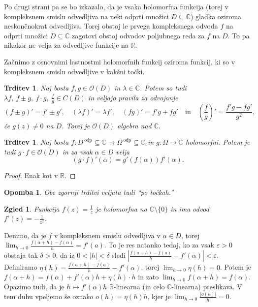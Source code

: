 \documentclass[10pt, a4paper]{article}
\newtheorem{trditev}[izr]{Trditev}
\newtheorem*{opomba}{Opomba}
\newtheorem{zgled}{Zgled}[section]
\newenvironment{noticeC}{%
  \tcolorbox[%
  notitle,
  empty,
  enhanced,  %
  breakable,
  coltext=black, 
  fontupper=\rmfamily,
  parbox=false,
  noparskip,
  sharp corners,
  boxrule=-1pt,  %
  frame hidden,
  left=7pt,  %
  right=7pt,
  top=5pt,
  bottom=5pt,
  before skip=2.5ex plus 2pt,
  after skip=2.5ex plus 2pt,
  overlay unbroken and last={%
  },
  ]}
{\endtcolorbox}
\newenvironment{dokaz}%
  {\begin{noticeC}\begin{proof}}%
  {\end{proof}\end{noticeC}}
\newcommand{\R}{\mathbb {R}}
\newcommand{\C}{\mathbb {C}}
\begin{document}
Po drugi strani pa se bo izkazalo, da je vsaka holomorfna funkcija 
(torej v kompleksnem smislu odvedljiva na neki odprti množici $D \subseteq \C$)
gladka oziroma neskončnokrat odvedljiva. Torej obstoj
le prvega kompleksnega odvoda $f$ na odprti množici $D \subseteq \C$
zagotovi obstoj odvodov poljubnega reda za $f$ na $D$.
To pa nikakor ne velja za odvedljive funkcije na $\R$.

Začnimo z osnovnimi lastnostmi holomorfnih funkcij oziroma funkcij,
ki so v kompleksnem smislu odvedljive v kakšni točki.

\begin{trditev}
  Naj bosta $f, g \in \mathcal{O}(D)$
  in $\lambda \in \C$. Potem so tudi $\lambda f,\ f \pm g,\ f \cdot g,\ \frac{f}{g} \in C(D)$
  in veljajo pravila za odvajanje
  $$(f \pm g)' = f' \pm g',\quad (\lambda f)' = \lambda f', \quad
  (fg)' = f'g + fg'\quad \mathrm{in}\quad \left(\frac{f}{g}\right)' = \frac{f' g - fg'}{g^2},$$
  če $g(z) \neq 0$ na $D$.
  Torej je $\mathcal{O} (D)$ algebra nad $\C$. 
\end{trditev}

\begin{trditev}
  Naj bosta $f: D^{\ \text{odp}} \subseteq \C \to \Omega^{\ \text{odp}} \subseteq \C$
  in $g: \Omega \to \C$ holomorfni.
  Potem je tudi $g \cdot f \in \mathcal{O}(D)$
  in za vsak $\alpha \in D$ velja $$(g \cdot f)'(\alpha) = g'(f(\alpha)) f'(\alpha).$$
\end{trditev}

\begin{dokaz}
  Enak kot v $\R$.
\end{dokaz}

\begin{opomba}
  Obe zgornji trditvi veljata tudi "`po točkah."'
\end{opomba}

\begin{zgled}
  Funkcija $f(z) = \frac{1}{z}$ je holomorfna na $\C \setminus \{0\}$
  in ima odvod $f'(z) = -\frac{1}{z^2}$.
\end{zgled}

Denimo, da je $f$ v kompleksnem smislu odvedljiva v $\alpha \in D$, 
torej $\lim_{h \to 0} \frac{f(\alpha + h) - f(\alpha)}{h} = f'(a)$.
To je res natanko tedaj, ko za vsak $\varepsilon > 0$ obstaja tak $\delta > 0$,
da iz $0 < |h| < \delta$ sledi $\left| \frac{f(a + h) - f(a)}{h} - f'(\alpha) \right| < \varepsilon$.
Definiramo $\eta (h) = \frac{f(a + h) - f(a)}{h} - f'(\alpha)$, torej $\lim_{h \to 0} \eta (h) = 0$.
Potem je $f(\alpha + h) = f(\alpha) + f'(\alpha) h + \eta (h) \cdot h$
in zato $\lim_{h \to 0} f(\alpha + h) = f(\alpha)$. Opazimo tudi,
da je $h \mapsto f'(\alpha) h$ $\R$-linearna (in celo $\C$-linearna) preslikava.
V tem duhu vpeljemo še oznako $o(h) = \eta (h) h$, kjer je $\lim_{h \to 0} \frac{|o(h)|}{|h|} = 0.$
\end{document}
